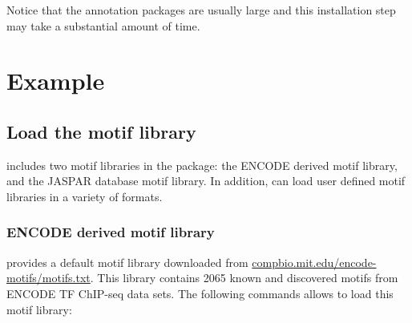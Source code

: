 \documentclass[a4paper,10pt]{article}\usepackage[]{graphicx}\usepackage[]{color}
\begin{document}



Notice that the annotation packages are usually large and this installation step may take a substantial amount of time.



\section{Example}

\subsection{Load the motif library}

 includes two motif libraries in the package: the ENCODE derived motif library, and the JASPAR database motif library. In addition,  can load user defined motif libraries in a variety of formats.

\subsubsection{ENCODE derived motif library}

 provides a default motif library downloaded from \url{compbio.mit.edu/encode-motifs/motifs.txt}. This library contains 2065 known and discovered motifs from ENCODE TF ChIP-seq data sets. The following commands allows to load this motif library:



\end{document}
